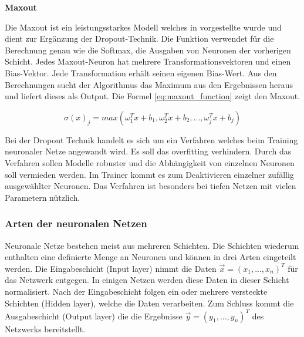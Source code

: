 %
\textbf{Maxout}\vspace{0.2cm}

Die Maxout ist ein leistungsstarkes Modell welches in \cite{goodfellow_maxout_2013} vorgestellte wurde und dient zur Ergänzung der Dropout-Technik. Die Funktion verwendet für die Berechnung genau wie die Softmax, die Ausgaben von Neuronen der vorherigen Schicht. Jedes Maxout-Neuron hat mehrere Transformationsvektoren und einen Bias-Vektor. Jede Transformation erhält seinen eigenen Bias-Wert. Aus den Berechnungen sucht der Algorithmus das Maximum aus den Ergebnissen heraus und liefert dieses als Output. Die Formel \ref{eq:maxout_function} zeigt den Maxout.

\begin{equation}\label{eq:maxout_function}
	\sigma (x)_{j} = max(\omega^T_1 x + b_1, \omega^T_2 x + b_2, ..., \omega^T_j x + b_j)
\end{equation}

Bei der Dropout Technik handelt es sich um ein Verfahren welches beim Training neuronaler Netze angewandt wird. Es soll das \gls{overfitting} verhindern. Durch das Verfahren sollen Modelle robuster und die Abhängigkeit von einzelnen Neuronen soll vermieden werden. Im Trainer kommt es zum Deaktivieren einzelner zufällig ausgewählter Neuronen. Das Verfahren ist besonders bei tiefen Netzen mit vielen Parametern nützlich.



\subsubsection{Arten der neuronalen Netzen}
Neuronale Netze bestehen meist aus mehreren Schichten. Die Schichten wiederum enthalten eine definierte Menge an Neuronen und können in drei Arten eingeteilt werden. Die Eingabeschicht (Input layer) nimmt die Daten $\overrightarrow{x}=(x_{1}, ..., x_{n})^T$ für das Netzwerk entgegen. In einigen Netzen werden diese Daten in dieser Schicht normalisiert. Nach der Eingabeschicht folgen ein oder mehrere versteckte Schichten (Hidden layer), welche die Daten verarbeiten. Zum Schluss kommt die Ausgabeschicht (Output layer) die die Ergebnisse $\overrightarrow{y}=(y_{1}, ..., y_{n})^T$ des Netzwerks bereitstellt.

